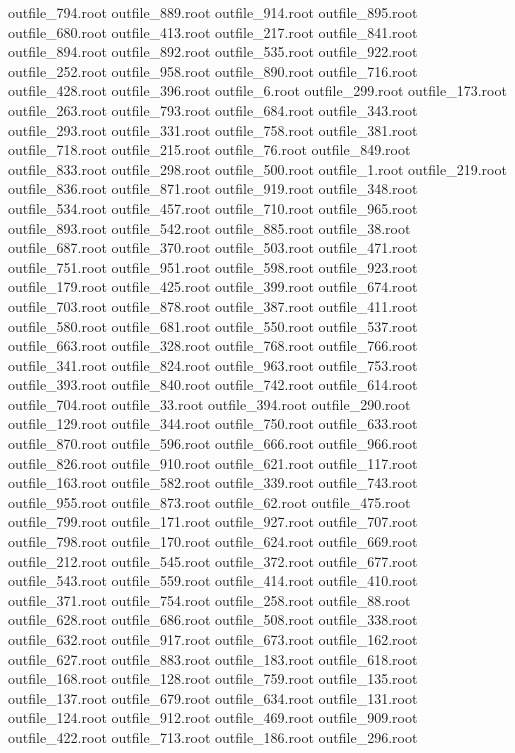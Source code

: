outfile_794.root
outfile_889.root
outfile_914.root
outfile_895.root
outfile_680.root
outfile_413.root
outfile_217.root
outfile_841.root
outfile_894.root
outfile_892.root
outfile_535.root
outfile_922.root
outfile_252.root
outfile_958.root
outfile_890.root
outfile_716.root
outfile_428.root
outfile_396.root
outfile_6.root
outfile_299.root
outfile_173.root
outfile_263.root
outfile_793.root
outfile_684.root
outfile_343.root
outfile_293.root
outfile_331.root
outfile_758.root
outfile_381.root
outfile_718.root
outfile_215.root
outfile_76.root
outfile_849.root
outfile_833.root
outfile_298.root
outfile_500.root
outfile_1.root
outfile_219.root
outfile_836.root
outfile_871.root
outfile_919.root
outfile_348.root
outfile_534.root
outfile_457.root
outfile_710.root
outfile_965.root
outfile_893.root
outfile_542.root
outfile_885.root
outfile_38.root
outfile_687.root
outfile_370.root
outfile_503.root
outfile_471.root
outfile_751.root
outfile_951.root
outfile_598.root
outfile_923.root
outfile_179.root
outfile_425.root
outfile_399.root
outfile_674.root
outfile_703.root
outfile_878.root
outfile_387.root
outfile_411.root
outfile_580.root
outfile_681.root
outfile_550.root
outfile_537.root
outfile_663.root
outfile_328.root
outfile_768.root
outfile_766.root
outfile_341.root
outfile_824.root
outfile_963.root
outfile_753.root
outfile_393.root
outfile_840.root
outfile_742.root
outfile_614.root
outfile_704.root
outfile_33.root
outfile_394.root
outfile_290.root
outfile_129.root
outfile_344.root
outfile_750.root
outfile_633.root
outfile_870.root
outfile_596.root
outfile_666.root
outfile_966.root
outfile_826.root
outfile_910.root
outfile_621.root
outfile_117.root
outfile_163.root
outfile_582.root
outfile_339.root
outfile_743.root
outfile_955.root
outfile_873.root
outfile_62.root
outfile_475.root
outfile_799.root
outfile_171.root
outfile_927.root
outfile_707.root
outfile_798.root
outfile_170.root
outfile_624.root
outfile_669.root
outfile_212.root
outfile_545.root
outfile_372.root
outfile_677.root
outfile_543.root
outfile_559.root
outfile_414.root
outfile_410.root
outfile_371.root
outfile_754.root
outfile_258.root
outfile_88.root
outfile_628.root
outfile_686.root
outfile_508.root
outfile_338.root
outfile_632.root
outfile_917.root
outfile_673.root
outfile_162.root
outfile_627.root
outfile_883.root
outfile_183.root
outfile_618.root
outfile_168.root
outfile_128.root
outfile_759.root
outfile_135.root
outfile_137.root
outfile_679.root
outfile_634.root
outfile_131.root
outfile_124.root
outfile_912.root
outfile_469.root
outfile_909.root
outfile_422.root
outfile_713.root
outfile_186.root
outfile_296.root

